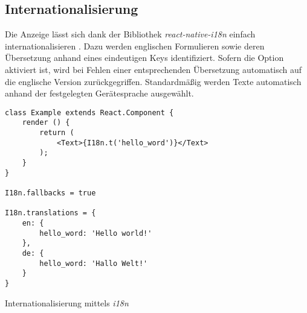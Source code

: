 \subsection{Internationalisierung}
Die Anzeige lässt sich dank der Bibliothek \textit{react-native-i18n} einfach internationalisieren \cite{react-native-i18n_2017}. Dazu werden englischen Formulieren sowie deren Übersetzung anhand eines eindeutigen Keys identifiziert. Sofern die Option  aktiviert ist, wird bei Fehlen einer entsprechenden Übersetzung automatisch auf die englische Version zurückgegriffen. Standardmäßig werden Texte automatisch anhand der festgelegten Gerätesprache ausgewählt.

\begin{listing}[H]
    \begin{verbatim}
class Example extends React.Component {
    render () {
        return (
            <Text>{I18n.t('hello_word')}</Text>
        );
    }
}

I18n.fallbacks = true

I18n.translations = {
    en: {
        hello_word: 'Hello world!'
    },
    de: {
        hello_word: 'Hallo Welt!'
    }
}
    \end{verbatim}
    \caption{Internationalisierung mittels \textit{i18n}}
    \label{lst:internationalizing}
\end{listing}


